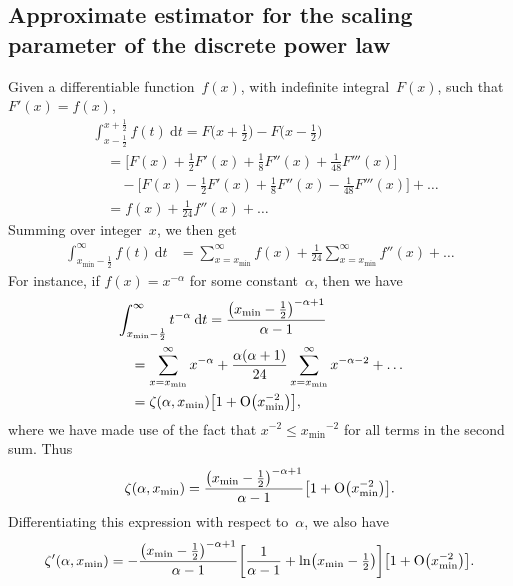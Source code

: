 \documentclass[final]{siamltex}
\renewcommand{\d}{\mathrm{d}}
\newcommand{\half}{\mbox{$\frac12$}}
\newcommand{\Ord}{\mathrm{O}}
\newcommand{\xmin}{\ensuremath{x_{\min}}}
\begin{document}
\begin{appendix}
\subsection{Approximate estimator for the scaling parameter of the discrete
 power law} Given a differentiable function~$f(x)$, with indefinite
integral~$F(x)$, such that $F'(x)=f(x)$,
\begin{align}
& \int_{x-\frac12}^{x+\frac12} f(t) \>\d t
   = F\bigl(x+\half\bigr) - F\bigl(x-\half\bigr)
                                            \nonumber\\
 & \quad = \bigl[ F(x) + \half F'(x) + \mbox{$\frac18$} F''(x)
      + \mbox{$\frac{1}{48}$} F'''(x) \bigr] \nonumber\\
 & \qquad{} - \bigl[ F(x) - \half F'(x) + \mbox{$\frac18$} F''(x)
      - \mbox{$\frac{1}{48}$} F'''(x) \bigr] + \ldots \nonumber\\
 & \quad = f(x) + \mbox{$\frac{1}{24}$} f''(x) + \ldots
\end{align}
Summing over integer~$x$, we then get
\begin{align}
\int_{\xmin-\frac12}^\infty f(t) \>\d t &= \sum_{x=\xmin}^\infty f(x)
 + \frac{1}{24} \sum_{x=\xmin}^\infty f''(x) + \ldots
\end{align}
For instance, if $f(x)=x^{-\alpha}$ for some constant~$\alpha$, then we
have
\begin{align}
& \int_{\xmin-\frac12}^\infty t^{-\alpha} \>\d t
 = {\bigl(\xmin-\frac12\bigr)^{-\alpha+1}\over\alpha-1} \nonumber\\
&\quad = \sum_{x=\xmin}^\infty x^{-\alpha}
  + \frac{\alpha(\alpha+1)}{24} \sum_{x=\xmin}^\infty x^{-\alpha-2}
  + \ldots \nonumber\\
&\quad = \zeta(\alpha,\xmin)
  \bigl[ 1 + \Ord\bigl(\xmin^{-2}\bigr) \bigr],
\end{align}
where we have made use of the fact that $x^{-2}\le \xmin^{-2}$ for all
terms in the second sum.  Thus
\begin{equation}
\zeta(\alpha,\xmin) =
 {\bigl(\xmin-\frac12\bigr)^{-\alpha+1}\over\alpha-1}
 \bigl[ 1 + \Ord\bigl(\xmin^{-2}\bigr) \bigr].
\end{equation}
Differentiating this expression with respect to~$\alpha$, we also have
\begin{equation}
\zeta'(\alpha,\xmin) =
- {\bigl( \xmin-\half \bigr)^{-\alpha+1}\over\alpha-1}
\biggl[ {1\over\alpha-1} + \ln \bigl( \xmin - \half \bigr) \biggr]
\bigl[ 1 + \Ord\bigl(\xmin^{-2}\bigr) \bigr].
\end{equation}


\end{appendix}
\end{document}

